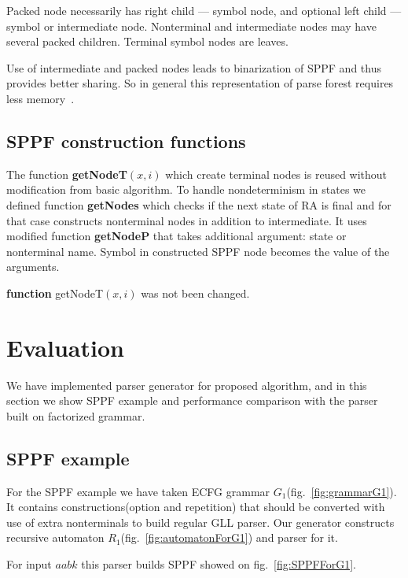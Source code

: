 \documentclass[runningheads,a4paper]{llncs}
\begin{document}
Packed node necessarily has right child --- symbol node, and optional left child --- symbol or intermediate node.
Nonterminal and intermediate nodes may have several packed children. 
Terminal symbol nodes are leaves.

Use of intermediate and packed nodes leads to binarization of SPPF and thus provides better sharing.
So in general this representation of parse forest requires less memory~\cite{brnglr}.

\subsection{SPPF construction functions}
The function \textbf{getNodeT$(x,i)$} which create terminal nodes is reused without modification from basic algorithm.
To handle nondeterminism in states we defined function \textbf{getNodes} which checks if the next state of RA
is final and for that case constructs nonterminal nodes in addition to intermediate.
It uses modified function \textbf{getNodeP} that takes additional argument: state or nonterminal name.
Symbol in constructed SPPF node becomes the value of the arguments.


\textbf{function} getNodeT$(x,i)$ was not been changed.

\section{Evaluation}

We have implemented parser generator for proposed algorithm, and
in this section we show SPPF example and performance comparison 
with the parser built on factorized grammar.

\subsection{SPPF example}

For the SPPF example we have taken ECFG grammar $G_1$(fig.~\ref{fig:grammarG1}).
It contains constructions(option and repetition) that should be converted with
use of extra nonterminals to build regular GLL parser. Our generator constructs
recursive automaton $R_1$(fig.~\ref{fig:automatonForG1}) and parser for it.

For input $ aabk $ this parser builds SPPF showed on fig.~\ref{fig:SPPFForG1}.
\end{document}
